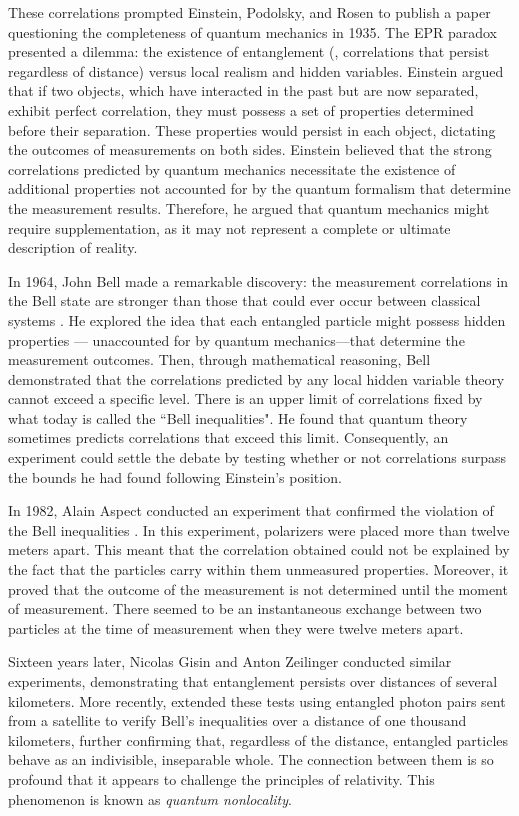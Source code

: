 These correlations prompted Einstein, Podolsky, and Rosen to publish a paper \cite{einstein1935can} questioning the completeness of quantum mechanics in 1935. The EPR paradox presented a dilemma: the existence of entanglement (, correlations that persist regardless of distance) versus local realism and hidden variables. Einstein argued that if two objects, which have interacted in the past but are now separated, exhibit perfect correlation, they must possess a set of properties determined before their separation. These properties would persist in each object, dictating the outcomes of measurements on both sides. Einstein believed that the strong correlations predicted by quantum mechanics necessitate the existence of additional properties not accounted for by the quantum formalism that determine the measurement results. Therefore, he argued that quantum mechanics might require supplementation, as it may not represent a complete or ultimate description of reality.


In 1964, John Bell made a remarkable discovery: the measurement correlations in the Bell state are stronger than those that could ever occur between  classical systems \cite{bell1964einstein}. He explored the idea that each entangled particle might possess hidden properties — unaccounted for by quantum mechanics—that determine the measurement outcomes. Then, through mathematical reasoning, Bell demonstrated that the correlations predicted by any local hidden variable theory cannot exceed a specific level.  There is an upper limit of correlations fixed by what today is called the ``Bell inequalities". He found that quantum theory sometimes predicts correlations that exceed this limit. Consequently, an experiment could  settle the debate by testing whether or not correlations surpass the bounds he had found following Einstein's position.


In 1982, Alain Aspect conducted an experiment that confirmed the violation of the Bell inequalities \cite{aspect1982experimental}. In this experiment, polarizers were placed more than twelve meters apart. This meant that the correlation obtained could not be explained by the fact that the particles carry within them unmeasured properties. Moreover, it proved that the outcome of the measurement is not determined until the moment of measurement. There seemed to be an instantaneous exchange between two particles at the time of measurement when they were twelve meters apart.



Sixteen years later, Nicolas Gisin \cite{tittel1998experimental} and Anton Zeilinger \cite{pan1998experimental} conducted similar experiments, demonstrating that entanglement persists over distances of several kilometers. More recently,  \cite{yin2017satellite} extended these tests using entangled photon pairs sent from a satellite to verify Bell's inequalities over a distance of one thousand kilometers, further confirming that, regardless of the distance, entangled particles behave as an indivisible, inseparable whole. The connection between them is so profound that it appears to challenge the principles of relativity. This phenomenon is known as \emph{quantum nonlocality}.

